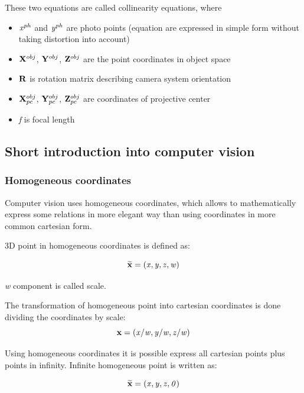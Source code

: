 \documentclass[a4paper,12pt]{article}
\newcommand{\ematr}[1]{
{\bf #1}
}
\newcommand{\evect}[1]{
{\bf #1}
}
\newcommand{\ehvect}[1]{
{\bf \widetilde{#1}}
}
\newcommand{\escal}[1]{
{\it #1}
}
\begin{document}
These two equations are called collinearity equations, where
\begin{itemize}
  \item $\escal{x}^{ph}$ and $\escal{y}^{ph}$ are photo points (equation are expressed in simple form without taking distortion into account)
  \item $\evect{X}^{obj}$, $\evect{Y}^{obj}$, $\evect{Z}^{obj}$ are the point coordinates in object space
  \item $\ematr{R}$ is rotation matrix describing camera system orientation
  \item $\evect{X}^{obj}_{pc}$, $\evect{Y}^{obj}_{pc}$, $\evect{Z}^{obj}_{pc}$ are coordinates of projective center
  \item \escal{f} is focal length
\end{itemize}

\subsection{Short introduction into computer vision}

\subsubsection{Homogeneous coordinates}

Computer vision uses homogeneous coordinates, which allows to mathematically express some relations
 in more elegant way than using coordinates in more common cartesian form. 

3D point in homogeneous coordinates is defined as:

\begin{equation}
\ehvect{x} = (\escal{x}, \escal{y}, \escal{z}, \escal{w})
\end{equation}

\escal{w} component is called scale.

The transformation of homogeneous point into cartesian coordinates is done dividing 
the coordinates by scale:
\begin{equation}
\evect{x} = (\escal{x} / \escal{w}, \escal{y} / \escal{w}, \escal{z} / \escal{w})
\end{equation}

Using homogeneous coordinates it is possible express all cartesian points plus points in infinity.
Infinite homogeneous point is written as: 

\begin{equation}
\ehvect{x} = (\escal{x}, \escal{y}, \escal{z}, \escal{0})
\end{equation}
\end{document}

